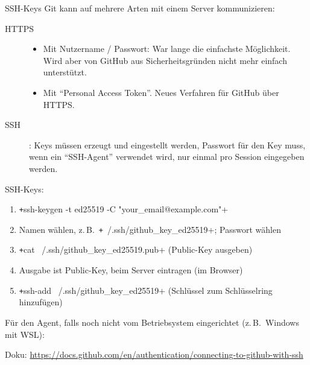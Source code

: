 \begin{frame}[fragile]{SSH-Keys}
  Git kann auf mehrere Arten mit einem Server kommunizieren:
  \begin{description}
    \item[HTTPS]
      \begin{itemize}
        \item Mit Nutzername / Passwort:
          War lange die einfachste Möglichkeit. Wird aber von GitHub aus Sicherheitsgründen nicht mehr einfach unterstützt.
        \item Mit \enquote{Personal Access Token}. Neues Verfahren für GitHub über HTTPS.
      \end{itemize}
    \item[SSH]: Keys müssen erzeugt und eingestellt werden, Passwort für den Key muss, wenn ein \enquote{SSH-Agent} verwendet wird, nur einmal pro Session eingegeben werden.
  \end{description}

  SSH-Keys:
  \begin{enumerate}
    \item \texttt+ssh-keygen -t ed25519 -C "your_email@example.com"+
    \item Namen wählen, z.\,B.\ \texttt+~/.ssh/github_key_ed25519+;
      Passwort wählen
    \item \texttt+cat ~/.ssh/github_key_ed25519.pub+
      \qquad (Public-Key ausgeben)
    \item Ausgabe ist Public-Key, beim Server eintragen (im Browser)
    \item \texttt+ssh-add ~/.ssh/github_key_ed25519+
      \qquad (Schlüssel zum Schlüsselring hinzufügen)
  \end{enumerate}

  Für den Agent, falls noch nicht vom Betriebsystem eingerichtet (z.\,B.\ Windows mit WSL):

  Doku: \url{https://docs.github.com/en/authentication/connecting-to-github-with-ssh}
\end{frame}
